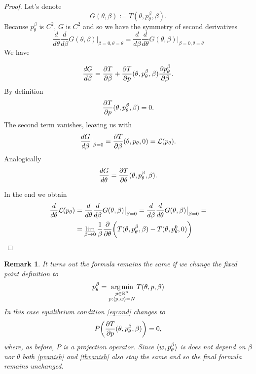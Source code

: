 \documentclass[a4paper,10.5pt]{report}
\newtheorem{remark}{Remark}
\begin{document}
\begin{proof} Let's denote
 \begin{equation}
 G(\theta, \beta) := T(\theta, p_\theta^\beta, \beta).
\end{equation}
Because $p_\theta^\beta$ is $C^2$, $G$ is $C^2$ and so we have the symmetry of second derivatives
\begin{equation}
 \frac{d}{d\theta}\frac{d}{d\beta}G(\theta,\beta)\big|_{\beta=0, \theta = \theta} =\frac{d}{d\beta}\frac{d}{d\theta}G(\theta,\beta)\big|_{\beta=0, \theta = \theta}
\end{equation}
We have

\begin{equation}\label{eqcond}
 \frac{dG}{d\beta} = \frac{\partial T}{\partial \beta} + \frac{\partial T}{\partial p}(\theta,p_\theta^{\beta}, \beta)\frac{\partial p_\theta^{\beta}}{\partial \beta}.
\end{equation}
By definition
\begin{equation}
\frac{\partial T}{\partial p}(\theta,p_\theta^{\beta}, \beta)=0.
\end{equation}
The second term vanishes, leaving us with
\begin{equation}\label{pvanish}
  \frac{dG}{d\beta}\big|_{\beta=0} = \frac{\partial T}{\partial \beta}(\theta, p_\theta, 0)=\mathcal{L}(p_\theta).
\end{equation}
Analogically
\begin{equation}\label{thvanish}
 \frac{dG}{d\theta}=\frac{\partial T}{\partial \theta}(\theta, p_\theta^{\beta}, \beta).
\end{equation}

In the end we obtain
\begin{align}
 \frac{d}{d\theta} \mathcal{L}(p_\theta) &=\frac{d}{d\theta}\frac{d}{d\beta}G(\theta,\beta)\big|_{\beta=0} = \frac{d}{d\beta}\frac{d}{d\theta}G(\theta,\beta)\big|_{\beta=0}=\\
 &=\lim_{\beta \to 0}\frac{1}{\beta} \frac{\partial }{\partial \theta} \bigg(T(\theta, p_\theta^\beta,\beta) - T(\theta, p_\theta^0, 0)\bigg)
\end{align}

\end{proof}

\begin{remark}
 It turns out the formula remains the same if we change the fixed point definition to
\begin{equation}
 p_\theta^\beta = \operatorname*{arg\,min}_{\substack{p \in \mathbb{R}^n \\ p: \langle p, w \rangle=N }} T(\theta, p, \beta)
\end{equation}
In this case equilibrium condition \ref{eqcond} changes to
\begin{equation*}
P\bigg(\frac{\partial T}{\partial p}(\theta,p_\theta^{\beta}, \beta)\bigg)=0,
\end{equation*}
where, as before, $P$ is a projection operator. Since $\langle w, p_\theta^{\beta} \rangle$ is does not depend on $\beta$ nor $\theta$ both \ref{pvanish} and \ref{thvanish} also stay the same and so the final formula remains unchanged.

\end{remark}
\end{document}
